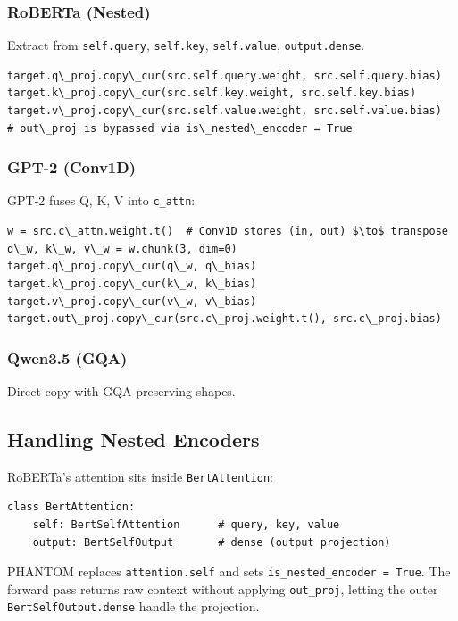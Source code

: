 \subsubsection{RoBERTa (Nested)}

Extract from \texttt{self.query}, \texttt{self.key}, \texttt{self.value}, \texttt{output.dense}.

\begin{lstlisting}
target.q\_proj.copy\_cur(src.self.query.weight, src.self.query.bias)
target.k\_proj.copy\_cur(src.self.key.weight, src.self.key.bias)
target.v\_proj.copy\_cur(src.self.value.weight, src.self.value.bias)
# out\_proj is bypassed via is\_nested\_encoder = True
\end{lstlisting}

\subsubsection{GPT-2 (Conv1D)}

GPT-2 fuses Q, K, V into \texttt{c\_attn}:

\begin{lstlisting}
w = src.c\_attn.weight.t()  # Conv1D stores (in, out) $\to$ transpose
q\_w, k\_w, v\_w = w.chunk(3, dim=0)
target.q\_proj.copy\_cur(q\_w, q\_bias)
target.k\_proj.copy\_cur(k\_w, k\_bias)
target.v\_proj.copy\_cur(v\_w, v\_bias)
target.out\_proj.copy\_cur(src.c\_proj.weight.t(), src.c\_proj.bias)
\end{lstlisting}

\subsubsection{Qwen3.5 (GQA)}

Direct copy with GQA-preserving shapes.

\subsection{Handling Nested Encoders}

RoBERTa's attention sits inside \texttt{BertAttention}:

\begin{lstlisting}
class BertAttention:
    self: BertSelfAttention      # query, key, value
    output: BertSelfOutput       # dense (output projection)
\end{lstlisting}

PHANTOM replaces \texttt{attention.self} and sets \texttt{is\_nested\_encoder = True}. The 
forward pass returns raw context without applying \texttt{out\_proj}, letting the 
outer \texttt{BertSelfOutput.dense} handle the projection.

